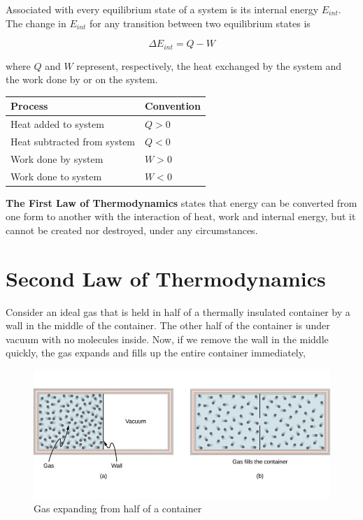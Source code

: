 \documentclass[14pt]{memoir}
\begin{document}
Associated with every equilibrium state of a system is its internal energy $E_{int}$.  The change in $E_{int}$  for any transition between two equilibrium states is

\begin{equation}
\Delta E_{int} = Q - W
\end{equation}

where $Q$ and $W$ represent, respectively, the heat exchanged by the system and the work done by or on the system.

\begin{center}
\begin{table}[]
\begin{tabular}{ll}
Process & Convention  \\ \hline
Heat added to system & $Q>0$ \\
Heat subtracted from system & $Q<0$ \\
Work done by system & $W>0$ \\
Work done to system & $W<0$ \\
\end{tabular}
\end{table}
\end{center}


\textbf{The First Law of Thermodynamics} states that energy can be converted from one form to another with the interaction of heat, work and internal energy, but it cannot be created nor destroyed, under any circumstances.



\section{Second Law of Thermodynamics}

Consider an ideal gas that is held in half of a thermally insulated container by a wall in the middle of the container. The other half of the container is under vacuum with no molecules inside. Now, if we remove the wall in the middle quickly, the gas expands and fills up the entire container immediately,

\begin{figure}[H]
\begin{center}
\includegraphics[scale=.5]{fig/fig_04_02.jpg}
\caption{Gas expanding from half of a container}
\label{fig:04_02}
\end{center}
\end{figure}
\end{document}

